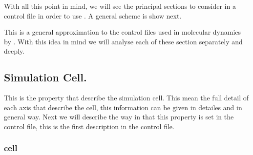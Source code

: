 With all this point in mind, we will see the principal sections to consider in
a control file in order to use {\lpmd}. A general scheme is show next.


This is a general approximation to the control files used in molecular dynamics
by {\lpmd}. With this idea in mind we will analyse each of these section
separately and deeply.

\subsection{Simulation Cell.}

This is the property that describe the simulation cell. This mean the full
detail of each axis that describe the cell, this information can be given in
detailes and in general way. Next we will describe the way in that this
property is set in the control file, this is the first description in the
control file.


\subsubsection{cell}

